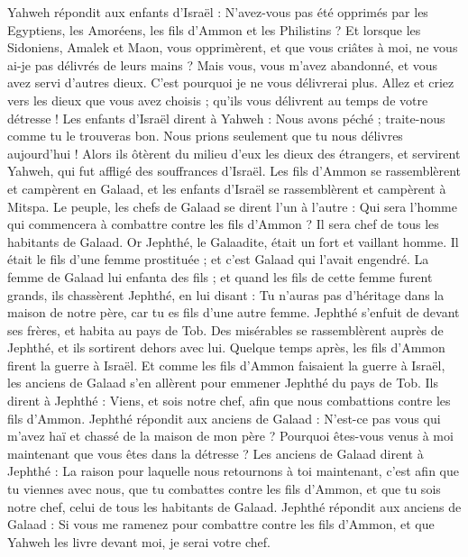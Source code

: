 \begin{multicols}{2}
Yahweh répondit aux enfants d'Israël : N'avez-vous pas été opprimés par les Egyptiens, les Amoréens, les fils d'Ammon et les Philistins ?
Et lorsque les Sidoniens, Amalek et Maon, vous opprimèrent, et que vous criâtes à moi, ne vous ai-je pas délivrés de leurs mains ?
Mais vous, vous m'avez abandonné, et vous avez servi d'autres dieux. C'est pourquoi je ne vous délivrerai plus.
Allez et criez vers les dieux que vous avez choisis ; qu'ils vous délivrent au temps de votre détresse !
Les enfants d'Israël dirent à Yahweh : Nous avons péché ; traite-nous comme tu le trouveras bon. Nous prions seulement que tu nous délivres aujourd'hui !
Alors ils ôtèrent du milieu d'eux les dieux des étrangers, et servirent Yahweh, qui fut affligé des souffrances d'Israël.
Les fils d'Ammon se rassemblèrent et campèrent en Galaad, et les enfants d'Israël se rassemblèrent et campèrent à Mitspa.
Le peuple, les chefs de Galaad se dirent l'un à l'autre : Qui sera l'homme qui commencera à combattre contre les fils d'Ammon ? Il sera chef de tous les habitants de Galaad.
\VerseOne{}Or Jephthé, le Galaadite, était un fort et vaillant homme. Il était le fils d'une femme prostituée ; et c'est Galaad qui l'avait engendré.
La femme de Galaad lui enfanta des fils ; et quand les fils de cette femme furent grands, ils chassèrent Jephthé, en lui disant : Tu n'auras pas d'héritage dans la maison de notre père, car tu es fils d'une autre femme.
Jephthé s'enfuit de devant ses frères, et habita au pays de Tob. Des misérables se rassemblèrent auprès de Jephthé, et ils sortirent dehors avec lui.
Quelque temps après, les fils d'Ammon firent la guerre à Israël.
Et comme les fils d'Ammon faisaient la guerre à Israël, les anciens de Galaad s'en allèrent pour emmener Jephthé du pays de Tob.
Ils dirent à Jephthé : Viens, et sois notre chef, afin que nous combattions contre les fils d'Ammon.
Jephthé répondit aux anciens de Galaad : N'est-ce pas vous qui m'avez haï et chassé de la maison de mon père ? Pourquoi êtes-vous venus à moi maintenant que vous êtes dans la détresse ?
Les anciens de Galaad dirent à Jephthé : La raison pour laquelle nous retournons à toi maintenant, c'est afin que tu viennes avec nous, que tu combattes contre les fils d'Ammon, et que tu sois notre chef, celui de tous les habitants de Galaad.
Jephthé répondit aux anciens de Galaad : Si vous me ramenez pour combattre contre les fils d'Ammon, et que Yahweh les livre devant moi, je serai votre chef.

\end{multicols}
